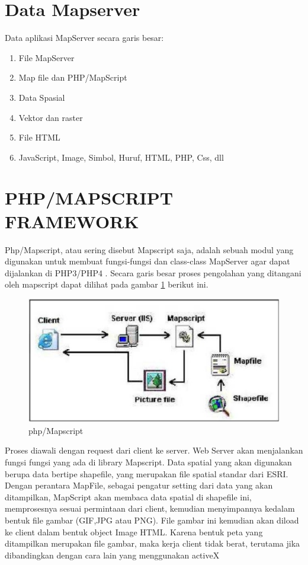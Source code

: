 \section{Data Mapserver}
Data aplikasi MapServer secara garis besar:
\begin{enumerate}
\item File MapServer
\item Map file dan PHP/MapScript
\item Data Spasial
\item Vektor dan raster
\item File HTML
\item JavaScript, Image, Simbol, Huruf, HTML, PHP, Css, dll
\end{enumerate}

\section{PHP/MAPSCRIPT FRAMEWORK}
Php/Mapscript, atau sering disebut Mapscript saja, adalah sebuah modul yang digunakan untuk membuat fungsi-fungsi dan class-class MapServer agar dapat dijalankan di PHP3/PHP4 \cite{baghdadi2015theia}. Secara garis besar proses pengolahan yang ditangani oleh mapscript dapat dilihat pada gambar \ref{php-mapscript} berikut ini.

\begin{figure}[ht]
\centering
\includegraphics[width=1\textwidth]{pictures/php-mapscript}
\caption{php/Mapscript}
\label{php-mapscript}
\end{figure}

Proses diawali dengan request dari client ke server. Web Server akan menjalankan fungsi fungsi yang ada di library Mapscript. Data spatial yang akan digunakan berupa data bertipe shapefile, yang merupakan file spatial standar dari ESRI. Dengan perantara MapFile, sebagai pengatur setting dari data yang akan ditampilkan, MapScript akan membaca data spatial di shapefile ini, memprosesnya sesuai permintaan dari client, kemudian menyimpannya kedalam bentuk file gambar (GIF,JPG atau PNG). File gambar ini kemudian akan diload ke client dalam bentuk object Image HTML. Karena bentuk peta yang ditampilkan merupakan file gambar, maka kerja client tidak berat, terutama jika dibandingkan dengan cara lain yang menggunakan activeX

